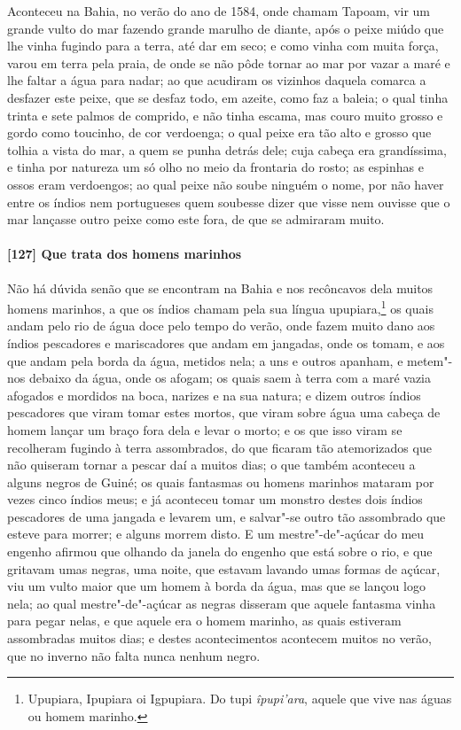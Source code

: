\begin{linenumbers}
Aconteceu na Bahia, no verão do ano de 1584, onde chamam Tapoam, vir um grande vulto do
mar fazendo grande marulho de diante, após o peixe miúdo que lhe vinha fugindo para a
terra, até dar em seco; e como vinha com muita força, varou em terra pela praia, de onde
se não pôde tornar ao mar por vazar a maré e lhe faltar a água para nadar; ao que acudiram
os vizinhos daquela comarca a desfazer este peixe, que se desfaz todo, em azeite, como faz
a baleia; o qual tinha trinta e sete palmos de comprido, e não tinha escama, mas couro
muito grosso e gordo como toucinho, de cor verdoenga; o qual peixe era tão alto e grosso
que tolhia a vista do mar, a quem se punha detrás dele; cuja cabeça era grandíssima, e
tinha por natureza um só olho no meio da frontaria do rosto; as espinhas e ossos eram
verdoengos; ao qual peixe não soube ninguém o nome, por não haver entre os índios nem
portugueses quem soubesse dizer que visse nem ouvisse que o mar lançasse outro peixe como
este fora, de que se admiraram muito.

\paragraph{[127] Que trata dos homens marinhos}\quad
Não há dúvida senão que se encontram na Bahia e nos recôncavos dela muitos homens
marinhos, a que os índios chamam pela sua língua upupiara,\footnote{ Upupiara, Ipupiara oi
Igpupiara. Do tupi \textit{îpupi'ara}, aquele que vive nas águas ou homem marinho.} os
quais andam pelo rio de água doce pelo tempo do verão, onde fazem muito dano aos índios
pescadores e mariscadores que andam em jangadas, onde os tomam, e aos que andam pela borda
da água, metidos nela; a uns e outros apanham, e metem"-nos debaixo da água, onde os
afogam; os quais saem à terra com a maré vazia afogados e mordidos na boca, narizes e na
sua natura; e dizem outros índios pescadores que viram tomar estes mortos, que viram sobre
água uma cabeça de homem lançar um braço fora dela e levar o morto; e os que isso viram se
recolheram fugindo à terra assombrados, do que ficaram tão atemorizados que não quiseram
tornar a pescar daí a muitos dias; o que também aconteceu a alguns negros de Guiné; os
quais fantasmas ou homens marinhos mataram por vezes cinco índios meus; e já aconteceu
tomar um monstro destes dois índios pescadores de uma jangada e levarem um, e salvar"-se
outro tão assombrado que esteve para morrer; e alguns morrem disto. E um mestre"-de"-açúcar
do meu engenho afirmou que olhando da janela do engenho que está sobre o rio, e que
gritavam umas negras, uma noite, que estavam lavando umas formas de açúcar, viu um vulto
maior que um homem à borda da água, mas que se lançou logo nela; ao qual mestre"-de"-açúcar
as negras disseram que aquele fantasma vinha para pegar nelas, e que aquele era o homem
marinho, as quais estiveram assombradas muitos dias; e destes acontecimentos acontecem
muitos no verão, que no inverno não falta nunca nenhum negro.


\end{linenumbers}
